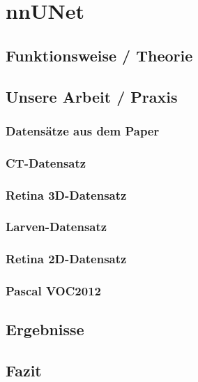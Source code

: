 \chapter{nnUNet}
\label{ch:nnunet}



\section{Funktionsweise / Theorie}


\section{Unsere Arbeit / Praxis}


\subsection{Datensätze aus dem Paper}
\subsection{CT-Datensatz}
\subsection{Retina 3D-Datensatz}


\subsection{Larven-Datensatz}
\subsection{Retina 2D-Datensatz}
\subsection{Pascal VOC2012}


\section{Ergebnisse}


\section{Fazit}
